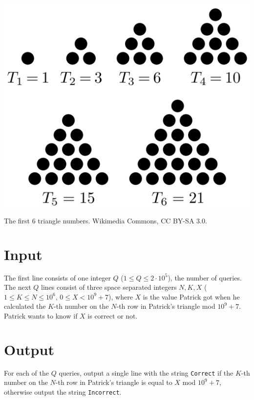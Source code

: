 \begin{minipage}{\textwidth}
\begin{center}

\includegraphics[width=.5\textwidth]{triangle.png}

The first 6 triangle numbers. Wikimedia Commons, CC BY-SA 3.0.
\end{center}
\end{minipage}


\section*{Input}
The first line consists of one integer $Q$ ($1 \leq Q \leq 2 \cdot 10^5$), the number of queries.
The next $Q$ lines consist of three space separated integers $N,K,X$ ($1 \leq K \leq N \leq 10^6$, $0 \leq X < 10^9+7$), 
where $X$ is the value Patrick got when he calculated the $K$-th number on the $N$-th row in Patrick's triangle mod $10^9 + 7$. 
Patrick wants to know if $X$ is correct or not.

\section*{Output}
For each of the $Q$ queries, output a single line with the string \texttt{Correct} if the $K$-th number on the $N$-th row in Patrick's triangle is equal to $X$ mod $10^9 + 7$, otherwise output the string \texttt{Incorrect}.
